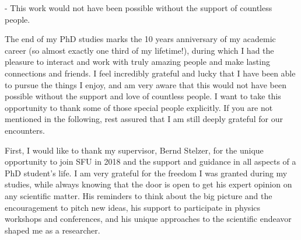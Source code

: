 - This work would not have been possible without the support of countless people.

The end of my PhD studies marks the 10 years anniversary of my academic career (so almost exactly one third of my lifetime!), during which I had the pleasure to interact and work with truly amazing people and make lasting connections and friends.
I feel incredibly grateful and lucky that I have been able to pursue the things I enjoy, and am very aware that this would not have been possible without the support and love of countless people. 
I want to take this opportunity to thank some of those special people explicitly.
If you are not mentioned in the following, rest assured that I am still deeply grateful for our encounters.

First, I would like to thank my supervisor, Bernd Stelzer, for the unique opportunity to join SFU in 2018 and the support and guidance in all aspects of a PhD student's life. 
I am very grateful for the freedom I was granted during my studies, while always knowing that the door is open to get his expert opinion on any scientific matter.
His reminders to think about the big picture and the encouragement to pitch new ideas, his support to participate in physics workshops and conferences, and his unique approaches to the scientific endeavor shaped me as a researcher. 

